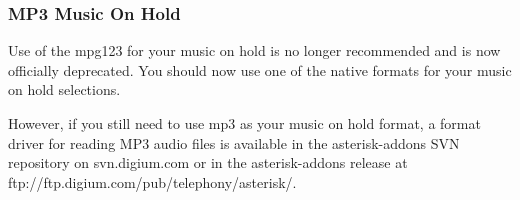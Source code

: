 \subsubsection{MP3 Music On Hold}

Use of the mpg123 for your music on hold is no longer recommended and is now
officially deprecated.  You should now use one of the native formats for your
music on hold selections.

However, if you still need to use mp3 as your music on hold format, a format
driver for reading MP3 audio files is available in the asterisk-addons SVN
repository on svn.digium.com or in the asterisk-addons release at
ftp://ftp.digium.com/pub/telephony/asterisk/.

